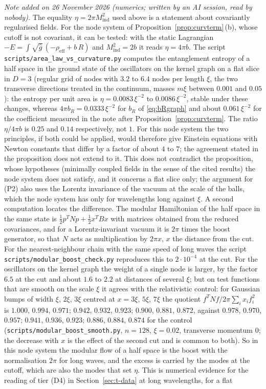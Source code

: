 \documentclass[11pt,a4paper]{article}
\theoremstyle{stmt}
\theoremstyle{defn}
\theoremstyle{rmk}
\numberwithin{equation}{section}
\begin{document}
\emph{Note added on 26 November 2026 (numerics; written by an AI session, read by nobody).} The equality $\eta=2\pi M_{\mathrm{ind}}^2$ used above is a statement about covariantly regularised fields. For the node system of Proposition~\ref{prop:curvterm}\,(b), whose cutoff is not covariant, it can be tested: with the static Lagrangian $-E=\int\sqrt{\hat g}\,(-\rho_{\mathrm{eff}}+b\,R)$ and $M_{\mathrm{ind}}^2=2b$ it reads $\eta=4\pi b$. The script \texttt{scripts/area\_law\_vs\_curvature.py} computes the entanglement entropy of a half space in the ground state of the oscillators on the kernel graph on a flat slice in $D=3$ (regular grid of nodes with $3.2$ to $6.4$ nodes per length $\xi$, the two transverse directions treated in the continuum, masses $m\xi$ between $0.001$ and $0.05$): the entropy per unit area is $\eta=0.0083\,\xi^{-2}$ to $0.0086\,\xi^{-2}$, stable under these changes, whereas $4\pi b_R=0.0333\,\xi^{-2}$ for $b_R$ of \eqref{eq:bRgraph} and about $0.061\,\xi^{-2}$ for the coefficient measured in the note after Proposition~\ref{prop:curvterm}. The ratio $\eta/4\pi b$ is $0.25$ and $0.14$ respectively, not $1$. For this node system the two principles, if both could be applied, would therefore give Einstein equations with Newton constants that differ by a factor of about $4$ to $7$; the agreement stated in the proposition does not extend to it. This does not contradict the proposition, whose hypotheses (minimally coupled fields in the sense of the cited results) the node system does not satisfy, and it concerns a flat slice only; the argument for (P2) also uses the Lorentz invariance of the vacuum at the scale of the balls, which the node system has only for wavelengths long against $\xi$. A second computation locates the difference. The modular Hamiltonian of the half space in the same state is $\tfrac12p^{T}Np+\tfrac12x^{T}Bx$ with matrices obtained from the reduced covariances, and for a Lorentz-invariant vacuum it is $2\pi$ times the boost generator, so that $N$ acts as multiplication by $2\pi x$, $x$ the distance from the cut. For the nearest-neighbour chain with the same speed of long waves the script \texttt{scripts/modular\_boost\_check.py} reproduces this to $2\cdot10^{-4}$ at the cut. For the oscillators on the kernel graph the weight of a single node is larger, by the factor $6.5$ at the cut and about $1.6$ to $2.2$ at distances of several $\xi$; but on test functions that are smooth on the scale $\xi$ it agrees with the relativistic control: for Gaussian bumps of width $\xi$, $2\xi$, $3\xi$ centred at $x=3\xi$, $5\xi$, $7\xi$ the quotient $f^{T}Nf/2\pi\sum_ix_if_i^2$ is $1.000$, $0.994$, $0.971$; $0.942$, $0.932$, $0.923$; $0.900$, $0.881$, $0.872$, against $0.978$, $0.970$, $0.957$; $0.941$, $0.936$, $0.923$; $0.886$, $0.884$, $0.874$ for the control (\texttt{scripts/modular\_boost\_smooth.py}, $n=128$, $\xi=0.02$, transverse momentum $0$; the decrease with $x$ is the effect of the second cut and is common to both). So in this node system the modular flow of a half space is the boost with the normalisation $2\pi$ for long waves, and the excess is carried by the modes at the cutoff, which are also the modes that set $\eta$. This is numerical evidence for the reading of tier \textup{(D4)} in Section~\ref{sec:t-data} at long wavelengths, for a flat 
\end{document}
